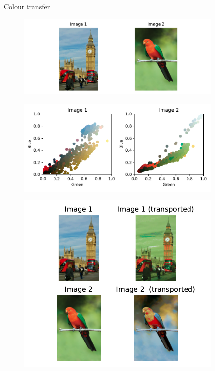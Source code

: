 \documentclass[pdf,aspectratio=169,10pt]{beamer}
\begin{document}
\begin{frame}{ Colour transfer}
\begin{minipage}{0.49\textwidth}
    \begin{figure}
        \includegraphics[width=0.9\textwidth]{../img/ex1_original_images.pdf}
    \end{figure}

    \begin{figure}
        \includegraphics[width=0.9\textwidth]{../img/ex1_colour_histograms.pdf}
    \end{figure}
    
\end{minipage}
\hfill
\begin{minipage}{0.49\textwidth}
    \begin{figure}
        \includegraphics[width=0.9\textwidth]{../img/ex1_result.pdf}
    \end{figure}
\end{minipage}


\end{frame}
\end{document}

